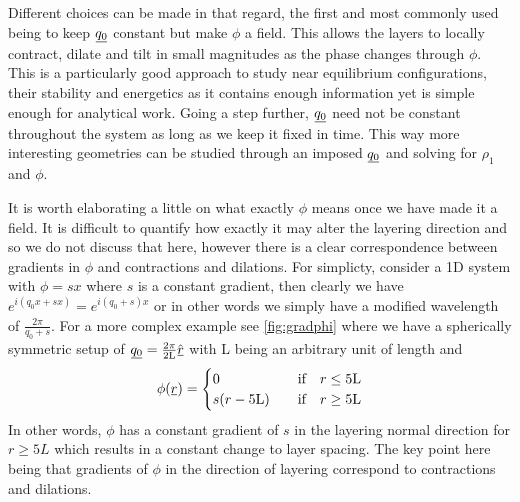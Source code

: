 \documentclass[12pt]{article}
\newcommand{\suf}[2]{\stackunder[0.5pt]{\stackunder[1pt]{\ensuremath{#1}}{\rule{\widthof{\ensuremath{#2}}*\real{0.9}}{.1ex}}}{}}
\newcommand{\su}[1]{\suf{#1}{#1}}
\begin{document}
        Different choices can be made in that regard, the first and most commonly used being to keep $\su{q_0}$ constant but make $\phi$ a field.
        This allows the layers to locally contract, dilate and tilt in small magnitudes as the phase changes through $\phi$.
        This is a particularly good approach to study near equilibrium configurations, their stability and energetics as it contains enough information yet is simple enough for analytical work.
        Going a step  further, $\su{q_0}$ need not be constant throughout the system as long as we keep it fixed in time.
        This way more interesting geometries can be studied through an imposed $\su{q_0}$ and solving for $\rho_1$ and $\phi$.

        It is worth elaborating a little on what exactly $\phi$ means once we have made it a field.
        It is difficult to quantify how exactly it may alter the layering direction and so we do not discuss that here, however there is a clear correspondence between gradients in $\phi$ and contractions and dilations.
        For simplicty, consider a 1D system with $\phi = s x$ where $s$ is a constant gradient, then clearly we have $e^{i(q_0 x + s x)} = e^{i(q_0 + s) x}$ or in other words we simply have a modified wavelength of $\frac{2\pi}{q_0 + s}$.
        For a more complex example see \cref{fig:gradphi} where we have a spherically symmetric setup of $\su{q_0} = \frac{2\pi}{2\si{L}} \hat{\su{r}}$ with \si{L} being an arbitrary unit of length and
        \begin{equation}\label{eq:gradphi_phi}
            \phi(\su{r}) = \begin{cases} 0 & \qq{if} r \leq 5\si{L} \\ s(r - 5\si{L}) & \qq{if} r \geq 5\si{L} \end{cases}
        \end{equation}
        In other words, $\phi$ has a constant gradient of $s$ in the layering normal direction for $r\geq5\si{L}$ which results in a constant change to layer spacing.
        The key point here being that gradients of $\phi$ in the direction of layering correspond to contractions and dilations.
\end{document}
